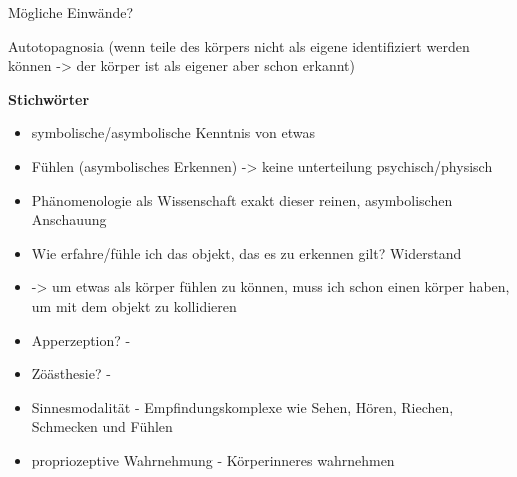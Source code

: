 \documentclass[a4paper, 12pt]{article}
\begin{document}
\begin{onehalfspace}
Mögliche Einwände?

Autotopagnosia (wenn teile des körpers nicht als eigene identifiziert werden können -> der körper ist als eigener aber schon erkannt)

\vspace{5mm}
\noindent\textbf{Stichwörter}
\begin{itemize}
  \item symbolische/asymbolische Kenntnis von etwas
  \item Fühlen (asymbolisches Erkennen) -> keine unterteilung psychisch/physisch
  \item Phänomenologie als Wissenschaft exakt dieser reinen, asymbolischen Anschauung
  \item Wie erfahre/fühle ich das objekt, das es zu erkennen gilt? Widerstand
  \item -> um etwas als körper fühlen zu können, muss ich schon einen körper haben, um mit dem objekt zu kollidieren 
  \item Apperzeption? - 
  \item Zöästhesie? - 
  \item Sinnesmodalität - Empfindungskomplexe wie Sehen, Hören, Riechen, Schmecken und Fühlen
  \item propriozeptive Wahrnehmung - Körperinneres wahrnehmen
\end{itemize}



\newpage

\end{onehalfspace}
\nocite{*}
\printbibliography
\end{document}
